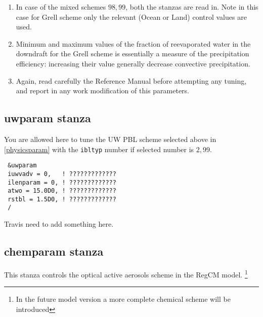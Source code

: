 \begin{enumerate}
\item In case of the mixed schemes $98, 99$, both the stanzas are read in. Note
in this case for Grell scheme only the relevant (Ocean or Land) control values
are used.
\item Minimum and maximum values of the fraction of reevaporated water in the
downdraft for the Grell scheme is essentially a measure of the precipitation
efficiency: increasing their value generally decrease convective precipitation.
\item Again, read carefully the Reference Manual before attempting any tuning,
and report in any work modification of this parameters.
\end{enumerate}

\subsection{uwparam stanza}

You are allowed here to tune the UW PBL scheme selected above in
\ref{physicsparam} with the \verb=ibltyp= number if selected number is
$2, 99$. 

{\footnotesize
\begin{Verbatim}
 &uwparam
 iuwvadv = 0,   ! ?????????????
 ilenparam = 0, ! ?????????????
 atwo = 15.0D0, ! ?????????????
 rstbl = 1.5D0, ! ?????????????
 /
\end{Verbatim}
}

Travis need to add something here.

\subsection{chemparam stanza}

This stanza controls the optical active aerosols scheme in the RegCM model.
\footnote{In the future model version a more complete chemical scheme will
be introduced} 

